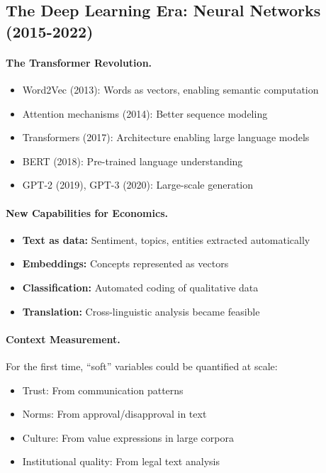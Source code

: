 \subsection{The Deep Learning Era: Neural Networks (2015-2022)}

\paragraph{The Transformer Revolution.}
\begin{itemize}
  \item Word2Vec (2013): Words as vectors, enabling semantic computation
  \item Attention mechanisms (2014): Better sequence modeling
  \item Transformers (2017): Architecture enabling large language models
  \item BERT (2018): Pre-trained language understanding
  \item GPT-2 (2019), GPT-3 (2020): Large-scale generation
\end{itemize}

\paragraph{New Capabilities for Economics.}
\begin{itemize}
  \item \textbf{Text as data:} Sentiment, topics, entities extracted automatically
  \item \textbf{Embeddings:} Concepts represented as vectors
  \item \textbf{Classification:} Automated coding of qualitative data
  \item \textbf{Translation:} Cross-linguistic analysis became feasible
\end{itemize}

\paragraph{Context Measurement.}
For the first time, ``soft'' variables could be quantified at scale:
\begin{itemize}
  \item Trust: From communication patterns
  \item Norms: From approval/disapproval in text
  \item Culture: From value expressions in large corpora
  \item Institutional quality: From legal text analysis
\end{itemize}

